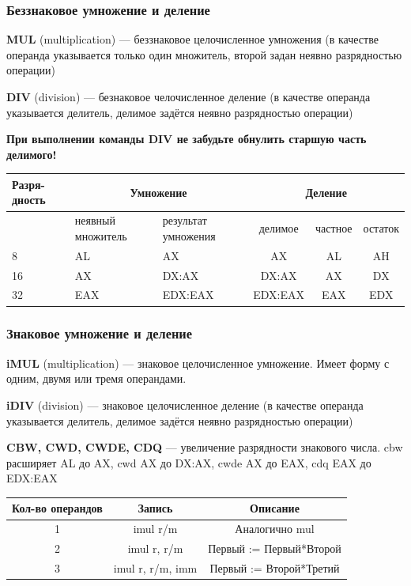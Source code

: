 \documentclass{beamer}
\begin{document}
    \begin{frame}[fragile]
        \frametitle{Беззнаковое умножение и деление}
        {\bf MUL } (multiplication) --- беззнаковое целочисленное умножения (в качестве операнда указывается только один множитель, второй задан неявно разрядностью операции)

        {\bf DIV } (division) --- безнаковое челочисленное деление (в качестве операнда указывается делитель, делимое задётся неявно разрядностью операции)

        {\bf При выполнении команды DIV не забудьте обнулить старшую часть делимого!}


        \begin{table}\small
            \begin{tabular}{|p{1cm}|p{2cm}|p{2cm}||c|c|c|}
                \hline Разря-дность & \multicolumn{2}{|c||}{Умножение} & \multicolumn{3}{|c|}{Деление} \\
                \hline  & неявный \newline множитель & результат \newline умножения & делимое & частное & остаток \\
                \hline 8 & AL & AX &  AX & AL & AH \\
                \hline 16 & AX & DX:AX & DX:AX & AX & DX \\
                \hline 32 & EAX & EDX:EAX & EDX:EAX & EAX & EDX \\
                \hline
            \end{tabular}
        \end{table}
\end{frame}
    \begin{frame}[fragile]
        \frametitle{Знаковое умножение и деление}
        {\bf iMUL } (multiplication) --- знаковое целочисленное умножение. Имеет форму с одним, двумя или тремя операндами.

        {\bf iDIV } (division) --- знаковое целочисленное деление (в качестве операнда указывается делитель, делимое задётся неявно разрядностью операции)

        {\bf CBW, CWD, CWDE, CDQ} --- увеличение разрядности знакового числа. cbw расширяет AL до AX, cwd AX до DX:AX, cwde AX до EAX, cdq EAX до EDX:EAX
        \begin{table}\small
            \begin{tabular}{|c|c|c|}
                \hline Кол-во операндов & Запись & Описание \\
                \hline 1 & imul r/m & Аналогично mul \\
                \hline 2 & imul r, r/m & Первый := Первый*Второй \\
                \hline 3 & imul r, r/m, imm & Первый := Второй*Третий \\
                \hline
            \end{tabular}
        \end{table}
\end{frame}
\end{document}
